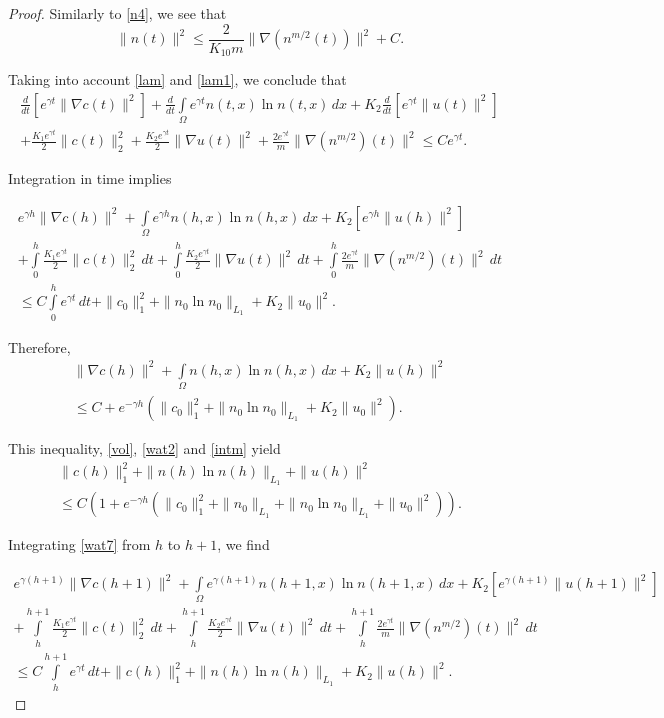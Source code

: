 \documentclass[10pt]{amsart}
\begin{document}
\begin{proof}
Similarly to \eqref{n4}, we see that \begin{equation}\label{wat6}
\|n(t)\|^2 \leq \frac 2 {K_{10} m} \|\nabla(n^{m/2}(t))\|^2 + C.
\end{equation}

Taking into account \eqref{lam} and \eqref{lam1}, we conclude that 
\begin{multline}\label{wat7}
\frac {d}{dt} [e^{\gamma t} \|\nabla c(t)\|^2] + \frac {d}{dt} \int\limits_{\Omega} e^{\gamma t} n(t,x)\ln n(t,x) \, dx+  K_2\frac {d}{dt} [e^{\gamma t} \|u(t)\|^2] \\ +\frac {K_1 e^{\gamma t} } 2  \|c(t)\|^2_2 + \frac {K_2  e^{\gamma t} } 2 \|\nabla u(t)\|^2+  \frac {2 e^{\gamma t}} m \|\nabla(n^{m/2})(t)\|^2 \leq C e^{\gamma t}.
\end{multline}

Integration in time implies 

\begin{multline}\label{wat8}
e^{\gamma h} \|\nabla c(h)\|^2 + \int\limits_{\Omega} e^{\gamma h} n(h,x)\ln n(h,x) \, dx+  K_2 [e^{\gamma h} \|u(h)\|^2] \\ +\int\limits_0^h \frac {K_1 e^{\gamma t} } 2  \|c(t)\|^2_2 \, dt+ \int\limits_0^h \frac {K_2  e^{\gamma t} } 2 \|\nabla u(t)\|^2\, dt+  \int\limits_0^h \frac {2 e^{\gamma t}} m \|\nabla(n^{m/2})(t)\|^2\, dt \\ \leq C\int\limits_0^h  e^{\gamma t}\, dt + \|c_0\|^2_1 + \|n_0\ln n_0\|_{L_1}+  K_2 \|u_0\|^2.
\end{multline}

Therefore, 
\begin{multline}\label{wat9}
 \|\nabla c(h)\|^2 + \int\limits_{\Omega} n(h,x)\ln n(h,x) \, dx+  K_2 \|u(h)\|^2 \\ \leq C+ e^{-\gamma h} (\|c_0\|^2_1 + \|n_0\ln n_0\|_{L_1}+  K_2 \|u_0\|^2).
\end{multline}

This inequality,  \eqref{vol}, \eqref{wat2} and \eqref{intm} yield
\begin{multline}\label{wat10}
 \|c(h)\|_1^2 + \|n(h)\ln n(h)\|_{L_1}+ \|u(h)\|^2 \\ \leq C(1+e^{-\gamma h} (\|c_0\|^2_1 +\|n_0\|_{L_1} +\|n_0\ln n_0\|_{L_1}+  \|u_0\|^2)).
\end{multline}

Integrating \eqref{wat7} from $h$ to $h+1$, we find

\begin{multline}\label{wat11}
e^{\gamma (h+1)} \|\nabla c(h+1)\|^2 + \int\limits_{\Omega} e^{\gamma (h+1)} n(h+1,x)\ln n(h+1,x) \, dx+  K_2 [e^{\gamma (h+1)} \|u(h+1)\|^2] \\ +\int\limits_h^{h+1} \frac {K_1 e^{\gamma t} } 2  \|c(t)\|^2_2 \, dt+\int\limits_h^{h+1} \frac {K_2  e^{\gamma t} } 2 \|\nabla u(t)\|^2\, dt+  \int\limits_h^{h+1} \frac {2 e^{\gamma t}} m \|\nabla(n^{m/2})(t)\|^2\, dt \\ \leq C\int\limits_h^{h+1}  e^{\gamma t}\, dt + \|c(h)\|^2_1 + \|n(h)\ln n(h)\|_{L_1}+  K_2 \|u(h)\|^2.
\end{multline}


\end{proof}
\end{document}
